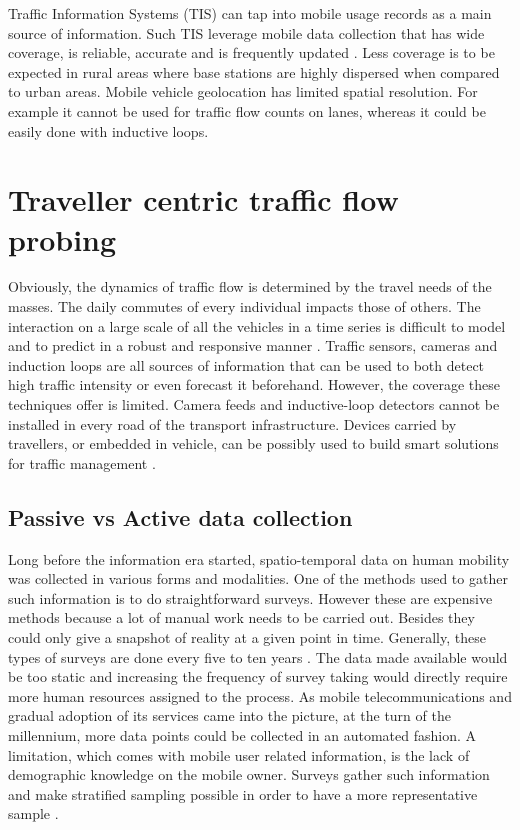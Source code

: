\documentclass[12pt, a4paper]{report}
\theoremstyle{definition}
\theoremstyle{definition}%
\theoremstyle{definition}%
\theoremstyle{definition}%
\theoremstyle{definition}%
\theoremstyle{definition}%
\begin{document}
Traffic Information Systems (TIS) can tap into mobile usage records as a main source of information. Such TIS leverage mobile data collection that has wide coverage, is reliable, accurate and is frequently updated  \cite{Leduc2008}. Less coverage is to be expected in rural areas where base stations are highly dispersed when compared to urban areas. Mobile vehicle geolocation has limited spatial resolution. For example it cannot be used for traffic flow counts on lanes, whereas it could be easily done with inductive loops. 

\section{Traveller centric traffic flow probing} \label{section:introduction:traveller_centric_traffic_flow_probing}

Obviously, the dynamics of traffic flow is determined by the travel needs of the masses. The daily commutes of every individual impacts those of others. The interaction on a large scale of all the vehicles in a time series is difficult to model and to predict in a robust and responsive manner \cite{VLAHOGIANNI20143}. Traffic sensors, cameras and induction loops are all sources of information that can be used to both detect high traffic intensity or even forecast it beforehand.  However, the coverage these techniques offer is limited. Camera feeds and inductive-loop detectors cannot be installed in every road of the transport infrastructure. Devices carried by travellers, or embedded in vehicle, can be possibly used to build smart solutions for traffic management \cite{VLAHOGIANNI20143}.


\subsection{Passive vs Active data collection}
Long before the information era started, spatio-temporal data on human mobility was collected in various forms and modalities. One of the methods used to gather such information is to do straightforward surveys\cite{Calabrese2013,Colak2015}. However these are expensive methods because a lot of manual work needs to be carried out. Besides they could only give a snapshot of reality at a given point in time.  Generally, these types of surveys are done every five to ten years \cite{Toole2015}. The data made available would be too static and increasing the frequency of survey taking would directly require more human resources assigned to the process. As mobile telecommunications and gradual adoption of its services came into the picture, at the turn of the millennium, more data points could be collected in an automated fashion. A limitation, which comes with mobile user related information, is the lack of demographic knowledge on the mobile owner. Surveys gather such information and make stratified sampling possible in order to have a more representative sample \cite{Colak2015}.
\end{document}
